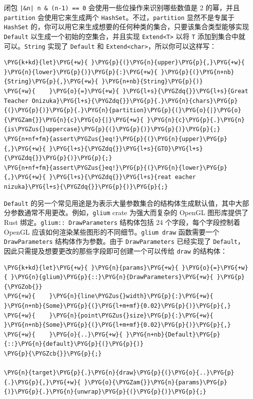 闭包 \texttt{|\&n| n \& (n-1) == 0} 会使用一些位操作来识别哪些数值是 2 的幂，并且 \texttt{partition} 会使用它来生成两个 \texttt{HashSet}。不过，\texttt{partition} 显然不是专属于 \texttt{HashSet} 的，你可以用它来生成想要的任何种类的集合，只要该集合类型能够实现 \texttt{Default} 以生成一个初始的空集合，并且实现 \texttt{Extend<T>} 以将 \texttt{T} 添加到集合中就可以。\texttt{String} 实现了 \texttt{Default} 和 \texttt{Extend<char>}，所以你可以这样写：

\begin{Verbatim}[commandchars=\\\{\},breaklines=true,breakanywhere=true,fontsize=\codefont,xleftmargin=17bp]
\PYG{k+kd}{let}\PYG{+w}{ }\PYG{p}{(}\PYG{n}{upper}\PYG{p}{,}\PYG{+w}{ }\PYG{n}{lower}\PYG{p}{)}\PYG{p}{:}\PYG{+w}{ }\PYG{p}{(}\PYG{n+nb}{String}\PYG{p}{,}\PYG{+w}{ }\PYG{n+nb}{String}\PYG{p}{)}
\PYG{+w}{    }\PYG{o}{=}\PYG{+w}{ }\PYG{l+s}{\PYGZdq{}}\PYG{l+s}{Great Teacher Onizuka}\PYG{l+s}{\PYGZdq{}}\PYG{p}{.}\PYG{n}{chars}\PYG{p}{(}\PYG{p}{)}\PYG{p}{.}\PYG{n}{partition}\PYG{p}{(}\PYG{o}{|}\PYG{o}{\PYGZam{}}\PYG{n}{c}\PYG{o}{|}\PYG{+w}{ }\PYG{n}{c}\PYG{p}{.}\PYG{n}{is\PYGZus{}uppercase}\PYG{p}{(}\PYG{p}{)}\PYG{p}{)}\PYG{p}{;}
\PYG{n+nf+fm}{assert\PYGZus{}eq!}\PYG{p}{(}\PYG{n}{upper}\PYG{p}{,}\PYG{+w}{ }\PYG{l+s}{\PYGZdq{}}\PYG{l+s}{GTO}\PYG{l+s}{\PYGZdq{}}\PYG{p}{)}\PYG{p}{;}
\PYG{n+nf+fm}{assert\PYGZus{}eq!}\PYG{p}{(}\PYG{n}{lower}\PYG{p}{,}\PYG{+w}{ }\PYG{l+s}{\PYGZdq{}}\PYG{l+s}{reat eacher nizuka}\PYG{l+s}{\PYGZdq{}}\PYG{p}{)}\PYG{p}{;}
\end{Verbatim}

\texttt{Default} 的另一个常见用途是为表示大量参数集合的结构体生成默认值，其中大部分参数通常不用更改。例如，\texttt{glium} crate 为强大而复杂的 OpenGL 图形库提供了 Rust 绑定。\texttt{glium:: DrawParameters} 结构体包括 24 个字段，每个字段控制着 OpenGL 应该如何渲染某些图形的不同细节。\texttt{glium draw} 函数需要一个 \texttt{DrawParameters} 结构体作为参数。由于 \texttt{DrawParameters} 已经实现了 \texttt{Default}，因此只需提及想要更改的那些字段即可创建一个可以传给 \texttt{draw} 的结构体：

\begin{Verbatim}[commandchars=\\\{\},breaklines=true,breakanywhere=true,fontsize=\codefont,xleftmargin=17bp]
\PYG{k+kd}{let}\PYG{+w}{ }\PYG{n}{params}\PYG{+w}{ }\PYG{o}{=}\PYG{+w}{ }\PYG{n}{glium}\PYG{p}{::}\PYG{n}{DrawParameters}\PYG{+w}{ }\PYG{p}{\PYGZob{}}
\PYG{+w}{    }\PYG{n}{line\PYGZus{}width}\PYG{p}{:}\PYG{+w}{ }\PYG{n+nb}{Some}\PYG{p}{(}\PYG{l+m+mf}{0.02}\PYG{p}{)}\PYG{p}{,}
\PYG{+w}{    }\PYG{n}{point\PYGZus{}size}\PYG{p}{:}\PYG{+w}{ }\PYG{n+nb}{Some}\PYG{p}{(}\PYG{l+m+mf}{0.02}\PYG{p}{)}\PYG{p}{,}
\PYG{+w}{    }\PYG{o}{..}\PYG{+w}{ }\PYG{n+nb}{Default}\PYG{p}{::}\PYG{n}{default}\PYG{p}{(}\PYG{p}{)}
\PYG{p}{\PYGZcb{}}\PYG{p}{;}

\PYG{n}{target}\PYG{p}{.}\PYG{n}{draw}\PYG{p}{(}\PYG{o}{..}\PYG{p}{.}\PYG{p}{,}\PYG{+w}{ }\PYG{o}{\PYGZam{}}\PYG{n}{params}\PYG{p}{)}\PYG{p}{.}\PYG{n}{unwrap}\PYG{p}{(}\PYG{p}{)}\PYG{p}{;}
\end{Verbatim}

